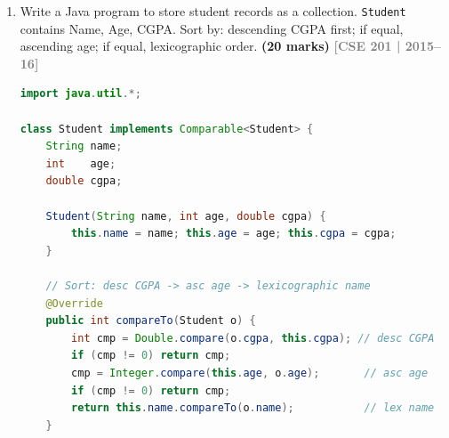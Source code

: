 \documentclass[12pt,a3paper]{article}
\newcommand{\yr}[1]{\hfill\textcolor{gray}{\small\textbf{[#1]}}}
\newcommand{\mk}[1]{\textcolor{orange!70!black}{\small\textbf{(#1 marks)}}}
\begin{document}
\begin{enumerate}
\begin{tcolorbox}[enhanced,breakable,ansbox,
  colback=cC!4,colframe=cC,boxrule=0.8pt,arc=5pt,
  title={\textbf{Answer --- TwoDimMatrix Class}},
  fonttitle=\bfseries\color{white},colbacktitle=cC]
\begin{lstlisting}[language=Java]
        TwoDimMatrix result = new TwoDimMatrix();
        // result = this * A^-1
        double[][] inv = {
            { A.m[1][1] / det, -A.m[0][1] / det},
            {-A.m[1][0] / det,  A.m[0][0] / det}
        };
        for (int i = 0; i < 2; i++)
            for (int j = 0; j < 2; j++)
                for (int k = 0; k < 2; k++)
                    result.m[i][j] += this.m[i][k] * inv[k][j];
        return result;
    }

    public static void main(String[] args) {
        TwoDimMatrix M = new TwoDimMatrix();
        M.input();
        System.out.println("Matrix M:"); M.print();
        System.out.println("det(M) = " + M.determinant());

        TwoDimMatrix A = new TwoDimMatrix();
        A.input();
        System.out.println("Matrix A:"); A.print();

        TwoDimMatrix Q = M.div(A);
        System.out.println("M / A:"); Q.print();
    }
}
\end{lstlisting}
\end{tcolorbox}

\item Write a Java program to store student records as a collection. \texttt{Student} contains Name, Age, CGPA. Sort by: descending CGPA first; if equal, ascending age; if equal, lexicographic order. \mk{20}
\yr{CSE 201 | 2015--16}

\begin{tcolorbox}[enhanced,breakable,ansbox,
  colback=cC!4,colframe=cC,boxrule=0.8pt,arc=5pt,
  title={\textbf{Answer --- Student Collection with Custom Sort}},
  fonttitle=\bfseries\color{white},colbacktitle=cC]
\begin{lstlisting}[language=Java]
import java.util.*;

class Student implements Comparable<Student> {
    String name;
    int    age;
    double cgpa;

    Student(String name, int age, double cgpa) {
        this.name = name; this.age = age; this.cgpa = cgpa;
    }

    // Sort: desc CGPA -> asc age -> lexicographic name
    @Override
    public int compareTo(Student o) {
        int cmp = Double.compare(o.cgpa, this.cgpa); // desc CGPA
        if (cmp != 0) return cmp;
        cmp = Integer.compare(this.age, o.age);       // asc age
        if (cmp != 0) return cmp;
        return this.name.compareTo(o.name);           // lex name
    }


\end{lstlisting}
\end{tcolorbox}
\end{enumerate}
\end{document}
